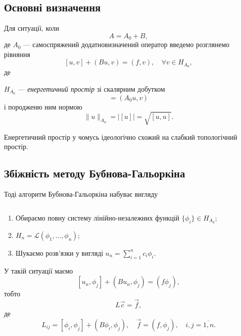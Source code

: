\subsection{Основні визначення}
Для ситуації, коли
\begin{equation}
    \label{eq:2.1}
    A = A_0 + B,
\end{equation}
де $A_0$ --- самоспряжений додатновизначений оператор введемо розглянемо рівняння
\begin{equation}
    \label{eq:2.2}
    [u, v] + (B u, v) = (f, v), \quad \forall v \in H_{A_0},
\end{equation}
де
\begin{definition}
    $H_{A_0}$ --- \textit{енергетичний простір} зі скалярним добутком 
    \begin{equation*}
        [u, v] = (A_0 u, v) 
    \end{equation*}
    і породженю ним нормою
    \begin{equation*}
        \|u\|_{A_0} = |[u]| = \sqrt{[u, u]}.
    \end{equation*}
\end{definition}
\begin{remark}
    Енергетичний простір у чомусь ідеологічно схожий на слабкий топологічний простір.
\end{remark}
\subsection{Збіжність методу Бубнова-Гальоркіна}
Тоді алгоритм Бубнова-Гальоркіна набуває вигляду
\begin{algorithm}
    $\left.\right.$
    \begin{enumerate}
        \item Обираємо повну систему лінійно-незалежних функцій $\{\phi_i\} \in H_{A_0}$;
        \item $H_n = \mathcal{L}(\phi_1, \ldots, \phi_n)$;
        \item Шукаємо розв'язки у вигляді $u_n = \sum_{i = 1}^n c_i \phi_i$.
    \end{enumerate}
\end{algorithm}

У такій ситуації маємо
\begin{equation}
    \label{eq:2.3}
    [u_n, \phi_j] + (B u_n, \phi_j) = (f \phi_j),
\end{equation}
тобто
\begin{equation}
    \label{eq:2.4}
    L \vec{c} = \vec{f},
\end{equation}
де
\begin{equation*}
    L_{ij} = [\phi_i, \phi_j] + (B \phi_i, \phi_j),  \quad \vec{f} = (f, \phi_j), \quad i, j = \overline{1,n}.
\end{equation*}

